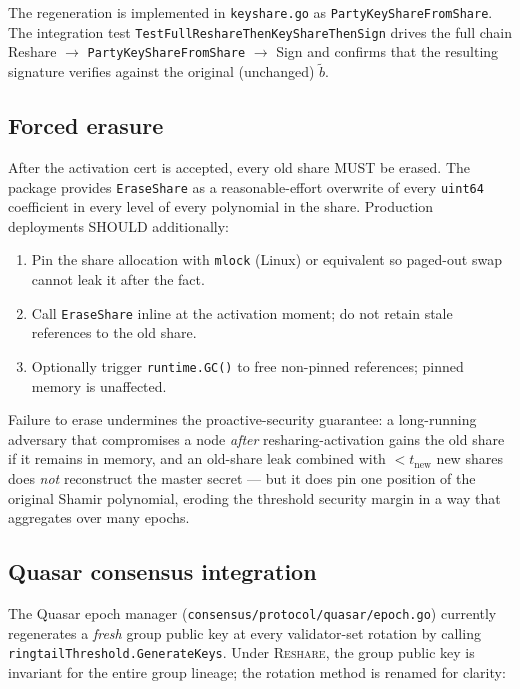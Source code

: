 The regeneration is implemented in \texttt{keyshare.go} as \texttt{PartyKey\-Share\-From\-Share}. The integration test \texttt{TestFullReshareThenKeyShareThenSign} drives the full chain Reshare $\to$ \texttt{PartyKey\-Share\-From\-Share} $\to$ Sign and confirms that the resulting signature verifies against the original (unchanged) $\tilde b$.

\subsection{Forced erasure}
\label{sec:resharing-erasure}

After the activation cert is accepted, every old share MUST be erased. The package provides \texttt{EraseShare} as a reasonable-effort overwrite of every \texttt{uint64} coefficient in every level of every polynomial in the share. Production deployments SHOULD additionally:
\begin{enumerate}
\item Pin the share allocation with \texttt{mlock} (Linux) or equivalent so paged-out swap cannot leak it after the fact.
\item Call \texttt{EraseShare} inline at the activation moment; do not retain stale references to the old share.
\item Optionally trigger \texttt{runtime.GC()} to free non-pinned references; pinned memory is unaffected.
\end{enumerate}
Failure to erase undermines the proactive-security guarantee: a long-running adversary that compromises a node \emph{after} resharing-activation gains the old share if it remains in memory, and an old-share leak combined with $< t_{\mathrm{new}}$ new shares does \emph{not} reconstruct the master secret --- but it does pin one position of the original Shamir polynomial, eroding the threshold security margin in a way that aggregates over many epochs.

\subsection{Quasar consensus integration}
\label{sec:resharing-quasar}

The Quasar epoch manager (\texttt{consensus/protocol/quasar/epoch.go}) currently regenerates a \emph{fresh} group public key at every validator-set rotation by calling \texttt{ringtailThreshold.GenerateKeys}. Under \textsc{Reshare}, the group public key is invariant for the entire group lineage; the rotation method is renamed for clarity:

